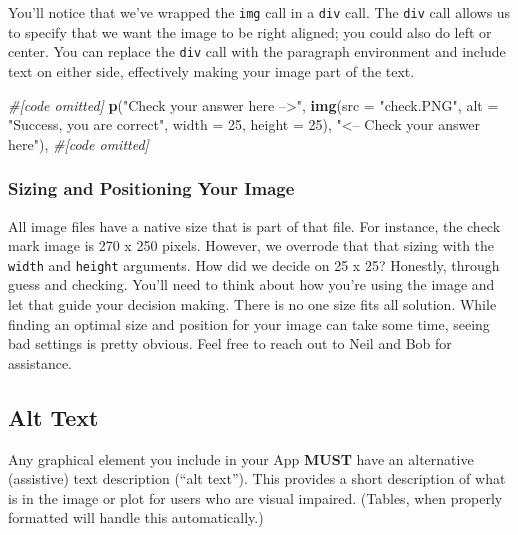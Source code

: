 \documentclass[
]{book}
\newenvironment{Shaded}{\begin{snugshade}}{\end{snugshade}}
\newcommand{\CommentTok}[1]{\textcolor[rgb]{0.56,0.35,0.01}{\textit{#1}}}
\newcommand{\DataTypeTok}[1]{\textcolor[rgb]{0.13,0.29,0.53}{#1}}
\newcommand{\DecValTok}[1]{\textcolor[rgb]{0.00,0.00,0.81}{#1}}
\newcommand{\KeywordTok}[1]{\textcolor[rgb]{0.13,0.29,0.53}{\textbf{#1}}}
\newcommand{\NormalTok}[1]{#1}
\newcommand{\StringTok}[1]{\textcolor[rgb]{0.31,0.60,0.02}{#1}}
\begin{document}
You'll notice that we've wrapped the \texttt{img} call in a \texttt{div} call. The \texttt{div} call allows us to specify that we want the image to be right aligned; you could also do left or center. You can replace the \texttt{div} call with the paragraph environment and include text on either side, effectively making your image part of the text.

\begin{Shaded}
\begin{Highlighting}[]
\CommentTok{#[code omitted]}
\KeywordTok{p}\NormalTok{(}\StringTok{"Check your answer here -->"}\NormalTok{,}
  \KeywordTok{img}\NormalTok{(}\DataTypeTok{src =} \StringTok{"check.PNG"}\NormalTok{,}
      \DataTypeTok{alt =} \StringTok{"Success, you are correct"}\NormalTok{,}
      \DataTypeTok{width =} \DecValTok{25}\NormalTok{, }\DataTypeTok{height =} \DecValTok{25}\NormalTok{),}
  \StringTok{"<-- Check your answer here"}\NormalTok{),}
\CommentTok{#[code omitted]}
\end{Highlighting}
\end{Shaded}

\hypertarget{sizing-and-positioning-your-image}{%
\subsubsection{Sizing and Positioning Your Image}\label{sizing-and-positioning-your-image}}

All image files have a native size that is part of that file. For instance, the check mark image is 270 x 250 pixels. However, we overrode that that sizing with the \texttt{width} and \texttt{height} arguments. How did we decide on 25 x 25? Honestly, through guess and checking. You'll need to think about how you're using the image and let that guide your decision making. There is no one size fits all solution. While finding an optimal size and position for your image can take some time, seeing bad settings is pretty obvious. Feel free to reach out to Neil and Bob for assistance.

\hypertarget{alt-text}{%
\subsection{Alt Text}\label{alt-text}}

Any graphical element you include in your App \textbf{MUST} have an alternative (assistive) text description (``alt text''). This provides a short description of what is in the image or plot for users who are visual impaired. (Tables, when properly formatted will handle this automatically.)
\end{document}
